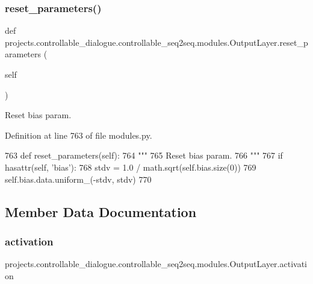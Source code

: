 \subsubsection{\texorpdfstring{reset\+\_\+parameters()}{reset\_parameters()}}
{\footnotesize\ttfamily def projects.\+controllable\+\_\+dialogue.\+controllable\+\_\+seq2seq.\+modules.\+Output\+Layer.\+reset\+\_\+parameters (\begin{DoxyParamCaption}\item[{}]{self }\end{DoxyParamCaption})}

\begin{DoxyVerb}Reset bias param.
\end{DoxyVerb}
 

Definition at line 763 of file modules.\+py.


\begin{DoxyCode}
763     \textcolor{keyword}{def }reset\_parameters(self):
764         \textcolor{stringliteral}{"""}
765 \textcolor{stringliteral}{        Reset bias param.}
766 \textcolor{stringliteral}{        """}
767         \textcolor{keywordflow}{if} hasattr(self, \textcolor{stringliteral}{'bias'}):
768             stdv = 1.0 / math.sqrt(self.bias.size(0))
769             self.bias.data.uniform\_(-stdv, stdv)
770 
\end{DoxyCode}


\subsection{Member Data Documentation}
\mbox{\label{classprojects_1_1controllable__dialogue_1_1controllable__seq2seq_1_1modules_1_1OutputLayer_a6f801585c2ad0e2f1645acdbdb96b976}} 
\subsubsection{\texorpdfstring{activation}{activation}}
{\footnotesize\ttfamily projects.\+controllable\+\_\+dialogue.\+controllable\+\_\+seq2seq.\+modules.\+Output\+Layer.\+activation}



